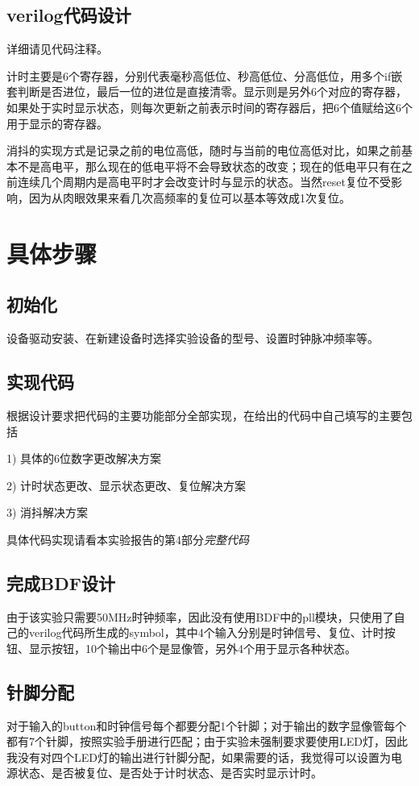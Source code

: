 \documentclass{article}
\begin{document}
        \subsection{verilog代码设计}
        	\par 详细请见代码注释。
            \par 计时主要是6个寄存器，分别代表毫秒高低位、秒高低位、分高低位，用多个if嵌套判断是否进位，最后一位的进位是直接清零。显示则是另外6个对应的寄存器，如果处于实时显示状态，则每次更新之前表示时间的寄存器后，把6个值赋给这6个用于显示的寄存器。
            \par 消抖的实现方式是记录之前的电位高低，随时与当前的电位高低对比，如果之前基本不是高电平，那么现在的低电平将不会导致状态的改变；现在的低电平只有在之前连续几个周期内是高电平时才会改变计时与显示的状态。当然reset复位不受影响，因为从肉眼效果来看几次高频率的复位可以基本等效成1次复位。
        
    \section{具体步骤}
    
    	\subsection{初始化} 设备驱动安装、在新建设备时选择实验设备的型号、设置时钟脉冲频率等。
        
        \subsection{实现代码} 根据设计要求把代码的主要功能部分全部实现，在给出的代码中自己填写的主要包括
        \par 1) 具体的6位数字更改解决方案
        \par 2) 计时状态更改、显示状态更改、复位解决方案
        \par 3) 消抖解决方案
        \par 具体代码实现请看本实验报告的第4部分\emph{完整代码}
        
        \subsection{完成BDF设计} 由于该实验只需要50MHz时钟频率，因此没有使用BDF中的pll模块，只使用了自己的verilog代码所生成的symbol，其中4个输入分别是时钟信号、复位、计时按钮、显示按钮，10个输出中6个是显像管，另外4个用于显示各种状态。
        
        \subsection{针脚分配} 对于输入的button和时钟信号每个都要分配1个针脚；对于输出的数字显像管每个都有7个针脚，按照实验手册进行匹配；由于实验未强制要求要使用LED灯，因此我没有对四个LED灯的输出进行针脚分配，如果需要的话，我觉得可以设置为电源状态、是否被复位、是否处于计时状态、是否实时显示计时。
\end{document}
